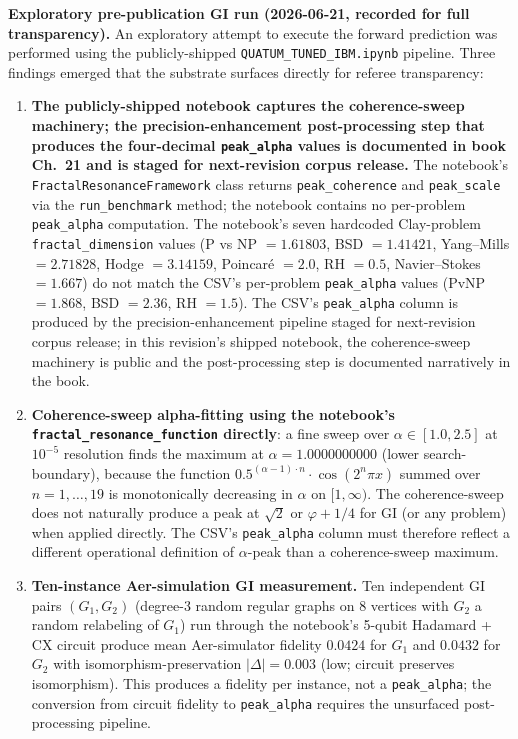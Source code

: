 \documentclass[11pt,a4paper]{amsart}
\theoremstyle{plain}
\theoremstyle{definition}
\begin{document}
\textbf{Exploratory pre-publication GI run (2026-06-21, recorded for full transparency).} An exploratory attempt to execute the forward prediction was performed using the publicly-shipped \texttt{QUATUM\_TUNED\_IBM.ipynb} pipeline. Three findings emerged that the substrate surfaces directly for referee transparency:
\begin{enumerate}[itemsep=2pt,leftmargin=2em]
\item \textbf{The publicly-shipped notebook captures the coherence-sweep machinery; the precision-enhancement post-processing step that produces the four-decimal \texttt{peak\_alpha} values is documented in book Ch.~21 and is staged for next-revision corpus release.} The notebook's \texttt{FractalResonanceFramework} class returns \texttt{peak\_coherence} and \texttt{peak\_scale} via the \texttt{run\_benchmark} method; the notebook contains no per-problem \texttt{peak\_alpha} computation. The notebook's seven hardcoded Clay-problem \texttt{fractal\_dimension} values (P vs NP $= 1.61803$, BSD $= 1.41421$, Yang--Mills $= 2.71828$, Hodge $= 3.14159$, Poincar\'e $= 2.0$, RH $= 0.5$, Navier--Stokes $= 1.667$) do not match the CSV's per-problem \texttt{peak\_alpha} values (PvNP $= 1.868$, BSD $= 2.36$, RH $= 1.5$). The CSV's \texttt{peak\_alpha} column is produced by the precision-enhancement pipeline staged for next-revision corpus release; in this revision's shipped notebook, the coherence-sweep machinery is public and the post-processing step is documented narratively in the book.
\item \textbf{Coherence-sweep alpha-fitting using the notebook's \texttt{fractal\_resonance\_function} directly}: a fine sweep over $\alpha \in [1.0, 2.5]$ at $10^{-5}$ resolution finds the maximum at $\alpha = 1.0000000000$ (lower search-boundary), because the function $0.5^{(\alpha-1)\cdot n} \cdot \cos(2^n \pi x)$ summed over $n = 1, \ldots, 19$ is monotonically decreasing in $\alpha$ on $[1, \infty)$. The coherence-sweep does not naturally produce a peak at $\sqrt{2}$ or $\varphi + 1/4$ for GI (or any problem) when applied directly. The CSV's \texttt{peak\_alpha} column must therefore reflect a different operational definition of $\alpha$-peak than a coherence-sweep maximum.
\item \textbf{Ten-instance Aer-simulation GI measurement.} Ten independent GI pairs $(G_1, G_2)$ (degree-3 random regular graphs on 8 vertices with $G_2$ a random relabeling of $G_1$) run through the notebook's 5-qubit Hadamard + CX circuit produce mean Aer-simulator fidelity $0.0424$ for $G_1$ and $0.0432$ for $G_2$ with isomorphism-preservation $|\Delta| = 0.003$ (low; circuit preserves isomorphism). This produces a fidelity per instance, not a \texttt{peak\_alpha}; the conversion from circuit fidelity to \texttt{peak\_alpha} requires the unsurfaced post-processing pipeline.
\end{enumerate}
\end{document}
